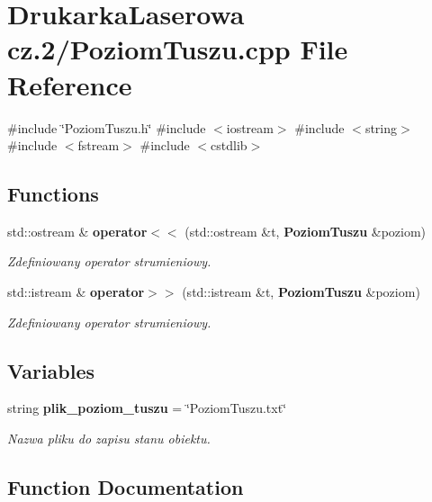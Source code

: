 \section{Drukarka\+Laserowa cz.2/\+Poziom\+Tuszu.cpp File Reference}
\label{_poziom_tuszu_8cpp}
{\ttfamily \#include \char`\"{}Poziom\+Tuszu.\+h\char`\"{}}\newline
{\ttfamily \#include $<$iostream$>$}\newline
{\ttfamily \#include $<$string$>$}\newline
{\ttfamily \#include $<$fstream$>$}\newline
{\ttfamily \#include $<$cstdlib$>$}\newline
\subsection*{Functions}
\begin{DoxyCompactItemize}
\item 
std\+::ostream \& \textbf{ operator$<$$<$} (std\+::ostream \&t, \textbf{ Poziom\+Tuszu} \&poziom)
\begin{DoxyCompactList}\small\item\em Zdefiniowany operator strumieniowy. \end{DoxyCompactList}\item 
std\+::istream \& \textbf{ operator$>$$>$} (std\+::istream \&t, \textbf{ Poziom\+Tuszu} \&poziom)
\begin{DoxyCompactList}\small\item\em Zdefiniowany operator strumieniowy. \end{DoxyCompactList}\end{DoxyCompactItemize}
\subsection*{Variables}
\begin{DoxyCompactItemize}
\item 
string \textbf{ plik\+\_\+poziom\+\_\+tuszu} = \char`\"{}Poziom\+Tuszu.\+txt\char`\"{}
\begin{DoxyCompactList}\small\item\em Nazwa pliku do zapisu stanu obiektu. \end{DoxyCompactList}\end{DoxyCompactItemize}


\subsection{Function Documentation}
\mbox{\label{_poziom_tuszu_8cpp_a2335c59cd225161a0d7800e1a45ac3a9}} 

